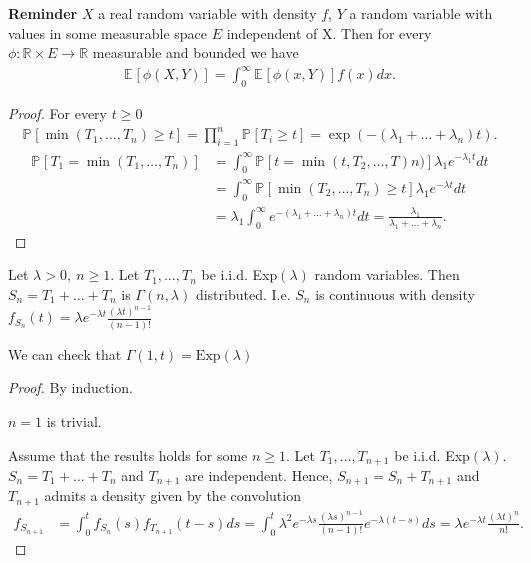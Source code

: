 \textbf{Reminder} $X$ a real random variable with density $f$, $Y$ a random variable with values in some measurable space $E$ independent of X. Then for every $\phi:\mathbb{R} \times E \to \mathbb{R}$ measurable and bounded we have  
\begin{align}
	\mathbb{E}_{} \left[ \phi(X,Y) \right] = \int_{0}^{\infty} \mathbb{E}_{} \left[ \phi(x,Y) \right] f(x) dx.
\end{align}
\begin{proof}
For every $t\geq 0$ 
\begin{align}
	\mathbb{P}_{} \left[ \min(T_1, \ldots , T_n) \geq t \right] = \prod_{i=1}^{n}\mathbb{P}_{} \left[ T_i \geq t \right] = \exp(-(\lambda _1 + \ldots + \lambda_n)t).
\end{align}
\begin{align}
	\mathbb{P}_{} \left[ T_1 = \min(T_1,\ldots ,T_n) \right] &= \int_{0}^{\infty } \mathbb{P}_{} \left[ t = \min(t, T_2, \ldots ,T)n) \right] \lambda _{1}e^{-\lambda_1 t} dt \\
								 &= \int_{0}^{\infty } \mathbb{P}_{} \left[ \min(T_2, \ldots ,T_n) \geq t \right] \lambda _1 e^{-\lambda t}dt \\
								 &= \lambda_1 \int_{0}^{\infty } e^{-(\lambda_1 + \ldots + \lambda_n)t}dt = \frac{\lambda_1}{\lambda_1 + \ldots + \lambda_n}.
\end{align}
\end{proof}


\begin{prop}
	Let $\lambda > 0,\ n\geq 1$. Let $T_1, \ldots, T_n$ be i.i.d. Exp$(\lambda)$ random variables. Then  $S_n = T_1+ \ldots +T_n$ is  $\Gamma(n, \lambda)$ distributed. I.e. $S_n$ is continuous with density $f_{S_n}(t)=\lambda e^{-\lambda t} \frac{(\lambda t)^{n-1}}{(n-1)!}$
\end{prop}
\begin{rmk}[]
We can check that $\Gamma(1,t)=\textrm{Exp}(\lambda)$
\end{rmk}

\begin{proof}
	By induction.

	$n=1$ is trivial.

	Assume that the results holds for some $n\geq 1$. Let $T_1,\ldots ,T_{n+1}$ be i.i.d. Exp$(\lambda)$. $S_n = T_1 + \ldots + T_n$ and $T_{n+1}$ are independent. Hence, $S_{n+1} = S_n + T_{n+1}$ and $T_{n+1}$ admits a density given by the convolution
	\begin{align}
		f_{S_{n+1}} &= \int_{0}^{t} f_{S_n}(s)f_{T_{n+1}}(t-s)ds = \int_{0}^{t} \lambda^2 e^{-\lambda s} \frac{(\lambda s)^{n-1}}{(n-1)!} e^{-\lambda(t-s)}ds = \lambda e^{-\lambda t} \frac{(\lambda t)^{n}}{n!}.
	\end{align}
\end{proof}


